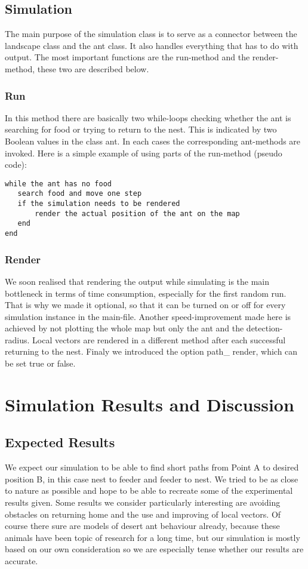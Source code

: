 \documentclass[11pt]{article}
\begin{document}
\subsection{Simulation}
The main purpose of the simulation class is to serve as a connector between the landscape class and the ant class. It also handles everything that has to do with output. The most important functions are the run-method and the render-method, these two are described below.

\subsubsection{Run}
In this method there are basically two while-loops checking whether the ant is searching for food or trying to return to the nest. This is indicated by two Boolean values in the class ant. In each cases the corresponding ant-methods are invoked. Here is a simple example of using parts of the run-method (pseudo code):

\begin{lstlisting}
while the ant has no food
   search food and move one step
   if the simulation needs to be rendered
       render the actual position of the ant on the map
   end
end
\end{lstlisting}

\subsubsection{Render}
We soon realised that rendering the output while simulating is the main bottleneck in terms of time consumption, especially for the first random run. That is why we made it optional, so that it can be turned on or off for every simulation instance in the main-file. Another speed-improvement made here is achieved by not plotting the whole map but only the ant and the detection-radius. Local vectors are rendered in a different method after each successful returning to the nest. Finaly we introduced the option path\_ render, which can be set true or false.

\newpage
\section{Simulation Results and Discussion}
\subsection{Expected Results}
We expect our simulation to be able to find short paths from Point A to desired position B, in this case nest to feeder and feeder to nest. We tried to be as close to nature as possible and hope to be able to recreate some of the experimental results given. Some results we consider particularly interesting are avoiding obstacles on returning home and the use and improving of local vectors. Of course there sure are models of desert ant behaviour already, because these animals have been topic of research for a long time, but our simulation is mostly based on our own consideration so we are especially tense whether our results are accurate.
\end{document}
